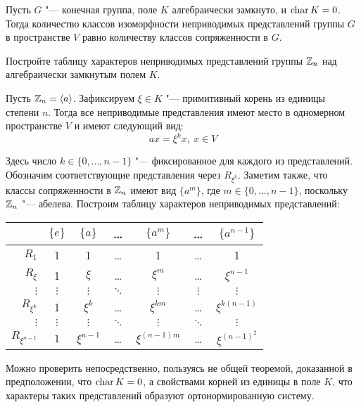 \begin{corollary}
	Пусть $G$ "--- конечная группа, поле $K$ алгебраически замкнуто, и $\operatorname{char}{K} = 0$. Тогда количество классов изоморфности неприводимых представлений группы $G$ в пространстве $V$ равно количеству классов сопряженности в $G$.
\end{corollary}

\begin{problem}
	Постройте таблицу характеров неприводимых представлений группы $\mathbb{Z}_n$ над алгебраически замкнутым полем $K$.
\end{problem}

\begin{solution}
	Пусть $\mathbb{Z}_n  = \langle a \rangle$. Зафиксируем $\xi \in K$ "--- примитивный корень из единицы степени $n$. Тогда все неприводимые представления имеют место в одномерном пространстве $V$ и имеют следующий вид:
	\[ax = \xi^k x,~x \in V\]
	
	Здесь число $k \in \{0, \dotsc, n - 1\}$ "--- фиксированное для каждого из представлений. Обозначим соответствующие представления через $R_{\xi^k}$. Заметим также, что классы сопряженности в $\mathbb{Z}_n$ имеют вид $\{a^m\}$, где $m \in \{0, \dotsc, n - 1\}$, поскольку $\mathbb{Z}_n$ "--- абелева. Построим таблицу характеров неприводимых представлений:
	\begin{center}
		\begin{tabular}{r|c|c|c|c|c|c}
			            & $\{e\}$  & $\{a\}$  &  \dots   & $\{a^m\}$  &  \dots  & $\{a^{n-1}\}$  \\ 
			            \hline
			   $R_1$    &    1     &    1     &  \dots   &     1      &  \dots  & 1 \\
			  $R_\xi$   &    1     &  $\xi$   &  \dots   &  $\xi^m$   &  \dots  & $\xi^{n-1}$ \\
			 $\vdots$   & $\vdots$ & $\vdots$ & $\ddots$ & $\vdots $  & $\vdots$ & $\vdots$ \\
			$R_{\xi^k}$ &    1     & $\xi^k$  &  \dots   & $\xi^{km}$ &  \dots  &  $\xi^{k(n-1)}$ \\
			 $\vdots$   & $\vdots$ & $\vdots$ & $\ddots$ &  $\vdots$  & $\ddots$ & $\vdots$\\
		 $R_{\xi^{n-1}}$ &    $1$     & $\xi^{n-1}$  &  \dots   & $\xi^{(n-1)m}$ &  \dots  &  $\xi^{(n-1)^2}$ \\
		\end{tabular}
	\end{center}

	Можно проверить непосредственно, пользуясь не общей теоремой, доказанной в предположении, что $\operatorname{char}{K} = 0$, а свойствами корней из единицы в поле $K$, что характеры таких представлений образуют ортонормированную систему.
\end{solution}